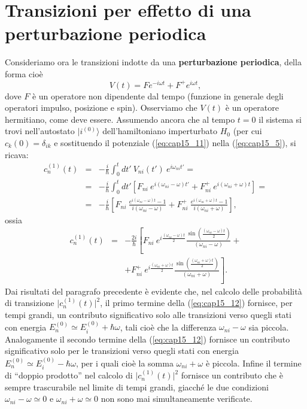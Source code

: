 \section{Transizioni per effetto di una perturbazione periodica}
Consideriamo ora le transizioni indotte da una \textbf{perturbazione periodica}, della forma cioè
\begin{equation}
V(t) = Fe^{-i\omega t} + F^+ e ^{i\omega t},
\label{eq:cap15_11}
\end{equation}
dove $F$ è un operatore non dipendente dal tempo (funzione in generale degli operatori impulso, posizione e spin). Osserviamo che $V(t)$ è un operatore hermitiano, come deve essere.		
Assumendo ancora che al tempo $t=0$ il sistema si trovi nell'autostato $\vert i ^{(0)}\rangle$ dell'hamiltoniano imperturbato $H_0$ (per cui $c_k (0) = \delta _{ik}$ e sostituendo il potenziale (\ref{eq:cap15_11}) nella (\ref{eq:cap15_5}), si ricava:
\begin{eqnarray}
c_n ^{(1)}(t) & = & -\frac{i}{\hbar}\int _0 ^t dt'\ V_{ni} (t') \ e^{i\omega _{ni}t'} = \nonumber \\
&=& -\frac{i}{\hbar}\int _0 ^t dt'\left[ F_{ni}\ e^{i(\omega _{ni}-\omega) t'} + F_{ni} ^+\ e ^{i(\omega _{ni} +\omega) t}\right] = \nonumber \\
&=& -\frac{i}{\hbar}\left[ F_{ni}\ \frac{e^{i(\omega _{ni}-\omega) t}-1}{i(\omega _{ni}-\omega)} + F_{ni} ^+\ \frac{e ^{i(\omega _{ni} +\omega) t}-1}{i(\omega _{ni}+\omega)}\right], 
\end{eqnarray}
ossia
\begin{eqnarray}
c_n ^{(1)}(t)&=&-\frac{2i}{\hbar}\left[ F_{ni}\ e^{i\frac{(\omega _{ni}-\omega) t}{2}}\frac{\sin(\frac{(\omega _{ni}-\omega) t}{2})}{(\omega _{ni}-\omega)} +\right. \nonumber \\
& &\left. + F_{ni} ^+\ e^{i\frac{(\omega _{ni}+\omega) t}{2}}\frac{\sin(\frac{(\omega _{ni}+\omega) t}{2})}{(\omega _{ni}+\omega)}\right].
\label{eq:cap15_12}
\end{eqnarray}
Dai risultati del paragrafo precedente è evidente che, nel calcolo delle probabilità di transizione $\vert c_n ^{(1)}(t)\vert ^2$, il primo termine della (\ref{eq:cap15_12}) fornisce, per tempi grandi, un contributo significativo solo alle transizioni verso quegli stati con energia $E_n ^{(0)} \simeq E_i ^{(0)}+ \hbar \omega $, tali cioè che la differenza  $\omega _{ni} - \omega$ sia piccola. Analogamente il secondo termine della (\ref{eq:cap15_12}) fornisce un contributo significativo solo per le transizioni verso quegli stati con energia  $E_n ^{(0)} \simeq E_i ^{(0)}- \hbar \omega $, per i quali cioè la somma $\omega _{ni} + \omega$ è piccola. Infine  il termine di ``doppio prodotto'' nel calcolo di  $\vert c_n ^{(1)}(t)\vert ^2$ fornisce un contributo che è sempre trascurabile nel limite di tempi grandi, giacché le due condizioni $\omega _{ni} - \omega\simeq 0$ e $\omega _{ni} + \omega\simeq 0$ non sono mai simultaneamente verificate.\\
